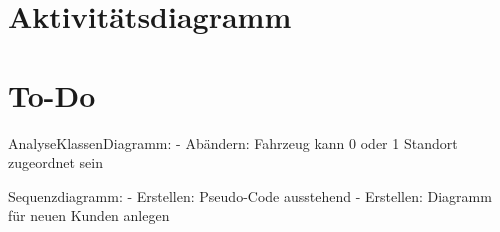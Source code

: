 \chapter{Aktivitätsdiagramm}

\chapter{To-Do}

AnalyseKlassenDiagramm: 
- Abändern: Fahrzeug kann 0 oder 1 Standort zugeordnet sein

Sequenzdiagramm:
- Erstellen: Pseudo-Code ausstehend
- Erstellen: Diagramm für neuen Kunden anlegen